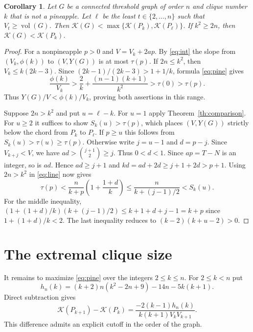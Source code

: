 \documentclass[11pt]{amsart}
\newtheorem{corollary}[theorem]{Corollary}
\numberwithin{equation}{section}
\newcommand{\K}{\mathcal K}
\DeclareMathOperator{\vol}{vol}
\begin{document}
\begin{corollary}\label{cor:clique}
Let $G$ be a connected threshold graph of order $n$ and clique number
$k$ that is not a pineapple. Let $\ell$ be the least $t\in\{2,\ldots,n\}$
such that $V_t\ge\vol(G)$. Then $\K(G)<\max\{\K(P_k),\K(P_\ell)\}$.
If $k^2\ge2n$, then $\K(G)<\K(P_k)$.
\end{corollary}
\begin{proof}
For a nonpineapple $p>0$ and $V=V_k+2ap$. By \eqref{eq:int} the
slope from $(V_k,\phi(k))$ to $(V,Y(G))$ is at most $\tau(p)$.
If $2n\le k^2$, then $V_k\le k(2k-3)$. Since
$(2k-1)/(2k-3)>1+1/k$, formula \eqref{eq:pine} gives
\[
 \frac{\phi(k)}{V_k}
 >\frac2k+\frac{(n-1)(k+1)}{k^2}
 >\tau(0)>\tau(p).
\]
Thus $Y(G)/V<\phi(k)/V_k$, proving both assertions in this range.

Suppose $2n>k^2$ and put $u=\ell-k$. For $u=1$ apply
Theorem~\ref{th:comparison}. For $u\ge2$ it suffices to show
$S_k(u)>\tau(p)$, which places $(V,Y(G))$ strictly below the chord
from $P_k$ to $P_\ell$. If $p\ge u$ this follows from
$S_k(u)>\tau(u)\ge\tau(p)$. Otherwise write $j=u-1$ and $d=p-j$.
Since $V_{k+j}<V$, we have $ad>\binom{j+1}{2}\ge j$.
Thus $0<d<1$. Since $ap=T-N$ is an integer, so is $ad$.
Hence $ad\ge j+1$ and $kd=ad+2d\ge j+1+2d>p+1$.
Using $2n>k^2$ in \eqref{eq:line} now gives
\[
 \tau(p)<\frac{n}{k+p}\left(1+\frac{1+d}{k}\right)
 \le\frac{n}{k+(j-1)/2}< S_k(u).
\]
For the middle inequality, $(1+(1+d)/k)(k+(j-1)/2)\le
k+1+d+j-1=k+p$ since $1+(1+d)/k<2$.
The last inequality reduces to $(k-2)(k+u-2)>0$.
\end{proof}

\section{The extremal clique size}\label{sec:cliquesize}
It remains to maximize \eqref{eq:pine} over the integers $2\le k\le n$.
For $2\le k<n$ put
\[
 h_n(k)=(k+2)n(k^2-2n+9)-14n-5k(k+1).
\]
Direct subtraction gives
\begin{equation}\label{eq:adj}
 \K(P_{k+1})-\K(P_k)
 =\frac{-2(k-1)h_n(k)}{k(k+1)V_kV_{k+1}} .
\end{equation}
This difference admits an explicit cutoff in the order of the graph.
\end{document}
